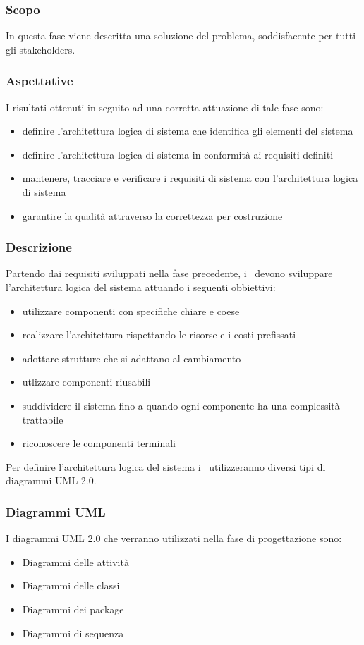 \documentclass[../NormeDiProgetto.tex]{subfiles}
\begin{document}
			\subsubsection{Scopo}
				In questa fase viene descritta una soluzione del problema, soddisfacente per tutti gli stakeholders.
			\subsubsection{Aspettative}
				I risultati ottenuti in seguito ad una corretta attuazione di tale fase sono:
				\begin{itemize}
					\item definire l'architettura logica di sistema che identifica gli elementi del sistema
					\item definire l'architettura logica di sistema in conformità ai requisiti definiti
					\item mantenere, tracciare e verificare i requisiti di sistema con l'architettura logica di sistema
					\item garantire la qualità attraverso la correttezza per costruzione
				\end{itemize}
			\subsubsection{Descrizione}
				Partendo dai requisiti sviluppati nella fase precedente, i \progettisti\ devono sviluppare l'architettura logica del sistema attuando i seguenti obbiettivi:
				\begin{itemize}
					\item utilizzare componenti con specifiche chiare e coese
					\item realizzare l'architettura rispettando le risorse e i costi prefissati
					\item adottare strutture che si adattano al cambiamento
					\item utlizzare componenti riusabili
					\item suddividere il sistema fino a quando ogni componente ha una complessità trattabile
					\item riconoscere le componenti terminali
				\end{itemize}
				Per definire l'architettura logica del sistema i \progettisti\ utilizzeranno diversi tipi di diagrammi UML 2.0.
			\subsubsection{Diagrammi UML}
				I diagrammi UML 2.0 che verranno utilizzati nella fase di progettazione sono:
				\begin{itemize}
					\item Diagrammi delle attività
					\item Diagrammi delle classi
					\item Diagrammi dei package
					\item Diagrammi di sequenza
				\end{itemize}
\end{document}

